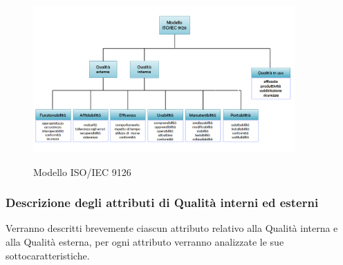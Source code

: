 \documentclass[../piano-di-qualifica.tex]{subfiles}
\begin{document}
\begin{figure}[H]
    \centering
    \includegraphics[width=10cm]{img/Modello_ISO-IEC_9126.png}
    \label{fig:modello_iso_eic_9126}
    \caption{Modello ISO/IEC 9126}
\end{figure}

\subsubsection{Descrizione degli attributi di Qualità interni ed esterni}%
\label{sec:descrizione_attributi_interni_esterni}
Verranno descritti brevemente ciascun attributo relativo alla Qualità interna e alla Qualità esterna, per ogni attributo verranno analizzate le sue sottocaratteristiche.
\end{document}
